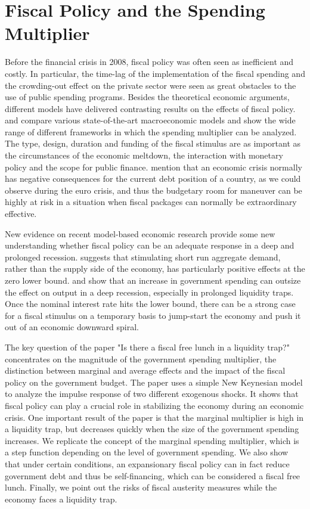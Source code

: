 \documentclass[12pt,a4paper,oneside,titlepage]{article}
\begin{document}
\section{Fiscal Policy and the Spending Multiplier }

Before the financial crisis in 2008, fiscal policy was often seen as inefficient and costly. In particular, the time-lag of the implementation of the fiscal spending and the crowding-out effect on the private sector were seen as great obstacles to the use of public spending programs. Besides the theoretical economic arguments, different models have delivered contrasting results on the effects of fiscal policy. \citet{CoenenG..2010} and \citet{Afonso.2010} compare various state-of-the-art macroeconomic models and show the wide range of different frameworks in which the spending multiplier can be analyzed. The type, design, duration and funding of the fiscal stimulus are as important as the circumstances of the economic meltdown, the interaction with monetary policy and the scope for public finance. \citet{Coenen.2010} mention that an economic crisis normally has negative consequences for the current debt position of a country, as we could observe during the euro crisis, and thus the budgetary room for maneuver can be highly at risk in a situation when fiscal packages can normally be extraordinary effective.
\par
\bigskip
New evidence on recent model-based economic research provide some new understanding whether fiscal policy can be an adequate response in a deep and prolonged recession. \citet{Eggertsson.2011} suggests that stimulating short run aggregate demand, rather than the supply side of the economy, has particularly positive effects at the zero lower bound. \citep{Davig.2009} and \citet{Christiano.2011} show that an increase in government spending can outsize the effect on output in a deep recession, especially in prolonged liquidity traps. Once the nominal interest rate hits the lower bound, there can be a strong case for a fiscal stimulus on a temporary basis to jump-start the economy and push it out of an economic downward spiral.
\par
\bigskip
The key question of the paper "Is there a fiscal free lunch in a liquidity trap?" concentrates on the magnitude of the government spending multiplier, the distinction between marginal and average effects and the impact of the fiscal policy on the government budget.
The paper uses a simple New Keynesian model to analyze the impulse response of two different exogenous shocks. It shows that fiscal policy can play a crucial role in stabilizing the economy during an economic crisis. One important result of the paper is that the marginal multiplier is high in a liquidity trap, but decreases quickly when the size of the government spending increases. We replicate the concept of the marginal spending multiplier, which is a step function depending on the level of government spending.
We also show that under certain conditions, an expansionary fiscal policy can in fact reduce government debt and thus be self-financing, which can be considered a fiscal free lunch. Finally, we point out the risks of fiscal austerity measures while the economy faces a liquidity trap.
\end{document}
